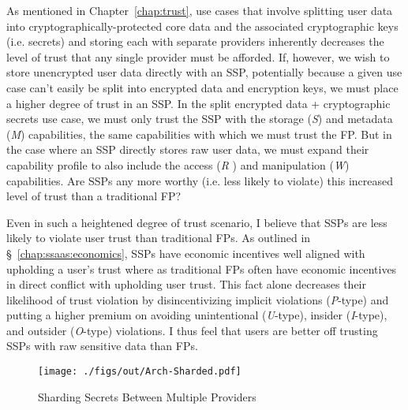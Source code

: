 As mentioned in Chapter~\ref{chap:trust}, use cases that involve
splitting user data into cryptographically-protected core data and the
associated cryptographic keys (i.e. secrets) and storing each with
separate providers inherently decreases the level of trust that any
single provider must be afforded. If, however, we wish to store
unencrypted user data directly with an SSP, potentially because a
given use case can't easily be split into encrypted data and
encryption keys, we must place a higher degree of trust in an SSP. In
the split encrypted data + cryptographic secrets use case, we must
only trust the SSP with the storage (\emph{S}) and metadata (\emph{M})
capabilities, the same capabilities with which we must trust the
FP. But in the case where an SSP directly stores raw user data, we
must expand their capability profile to also include the access
(\emph{R} ) and manipulation (\emph{W}) capabilities. Are SSPs any
more worthy (i.e. less likely to violate) this increased level of
trust than a traditional FP?

Even in such a heightened degree of trust scenario, I believe that
SSPs are less likely to violate user trust than traditional FPs. As
outlined in \S~\ref{chap:ssaas:economics}, SSPs have economic
incentives well aligned with upholding a user's trust where as
traditional FPs often have economic incentives in direct conflict with
upholding user trust. This fact alone decreases their likelihood of
trust violation by disincentivizing implicit violations
(\emph{P}-type) and putting a higher premium on avoiding unintentional
(\emph{U}-type), insider (\emph{I}-type), and outsider (\emph{O}-type)
violations. I thus feel that users are better off trusting SSPs with
raw sensitive data than FPs.

\begin{figure}[t]
  \centering
  \texttt{[image: ./figs/out/Arch-Sharded.pdf]}
  \caption{Sharding Secrets Between Multiple Providers}
  \label{fig:ssaas-sharded}
\end{figure}

